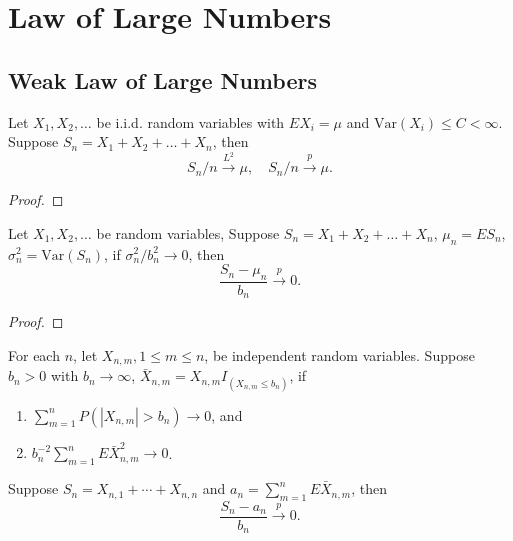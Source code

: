 \chapter{Law of Large Numbers}

\section{Weak Law of Large Numbers}

\begin{theorem}
	Let $X_1,X_2,\ldots$ be i.i.d. random variables with $EX_i=\mu$ and $\text{Var}(X_i)\leq C<\infty$. Suppose $S_n=X_1+X_2+\ldots+X_n$, then
	\begin{equation}
		S_n/n\stackrel{L^2}{\rightarrow}\mu,\quad S_n/n\stackrel{p}{\rightarrow}\mu.
	\end{equation}
\end{theorem}

\begin{proof}

\end{proof}

\begin{theorem}
	Let $X_1,X_2,\ldots$ be random variables, Suppose $S_n=X_1+X_2+\ldots+X_n$, $\mu_n=ES_n$, $\sigma_n^2=\text{Var}(S_n)$, if $\sigma_n^2/b_n^2\rightarrow 0$, then
	\begin{equation}
		\frac{S_n-\mu_n}{b_n}\stackrel{p}{\rightarrow}0.
	\end{equation}
\end{theorem}

\begin{proof}

\end{proof}

\begin{theorem}
	For each $n$, let $X_{n,m},1\leq m\leq n$, be independent random variables. Suppose $b_n>0$ with $b_n\rightarrow\infty$, $\bar{X}_{n,m}=X_{n,m}I_{\left(X_{n,m}\leq b_n\right)}$, if
	\begin{enumerate}
		\item $\sum_{m=1}^{n}P\left(\left|X_{n,m}\right|>b_{n}\right)\rightarrow 0$, and
		\item $b_{n}^{-2}\sum_{m=1}^{n}E\bar{X}_{n,m}^{2}\rightarrow 0$.
	\end{enumerate}
	Suppose $S_{n}=X_{n, 1}+\cdots+X_{n,n}$ and $a_{n}=\sum_{m=1}^{n}E\bar{X}_{n,m}$, then
	\begin{equation}
		\frac{S_n-a_n}{b_n}\stackrel{p}{\rightarrow}0.
	\end{equation}
\end{theorem}

